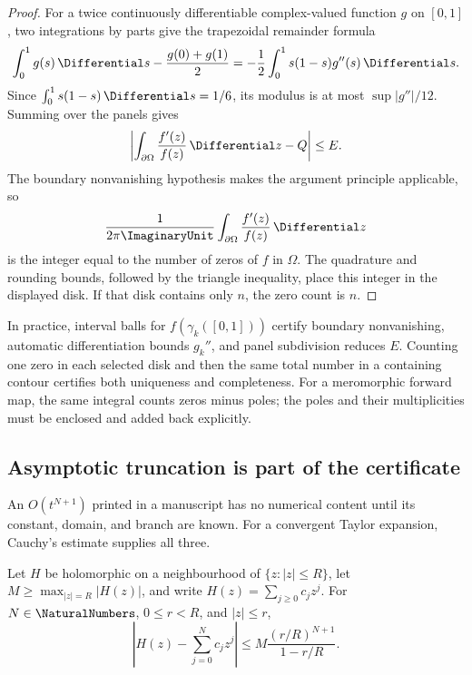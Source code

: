 \begin{proof}
For a twice continuously differentiable complex-valued function \(g\) on
\([0,1]\), two integrations by parts give the trapezoidal remainder formula
\[
 \int_0^1g(s)\,\Differential s-\frac{g(0)+g(1)}2
 =-\frac12\int_0^1s(1-s)g''(s)\,\Differential s.
\]
Since \(\int_0^1s(1-s)\,\Differential s=1/6\), its modulus is at most
\(\sup\lvert g''\rvert/12\).  Summing over the panels gives
\[
 \left\lvert\int_{\partial\Omega}\frac{f'(z)}{f(z)}\,\Differential z-Q\right\rvert
 \le E.
\]
The boundary nonvanishing hypothesis makes the argument principle applicable,
so
\[
 \frac1{2\pi\ImaginaryUnit}\int_{\partial\Omega}\frac{f'(z)}{f(z)}\,\Differential z
\]
is the integer equal to the number of zeros of \(f\) in \(\Omega\).  The
quadrature and rounding bounds, followed by the triangle inequality, place
this integer in the displayed disk.  If that disk contains only \(n\), the
zero count is \(n\).
\end{proof}

In practice, interval balls for \(f(\gamma_k([0,1]))\) certify boundary
nonvanishing, automatic differentiation bounds \(g_k''\), and panel
subdivision reduces \(E\).  Counting one zero in each selected disk and then
the same total number in a containing contour certifies both uniqueness and
completeness.  For a meromorphic forward map, the same integral counts zeros
minus poles; the poles and their multiplicities must be enclosed and added
back explicitly.

\subsection{Asymptotic truncation is part of the certificate}
\label{sec:asymptotic-truncation-discipline}

An \(O(t^{N+1})\) printed in a manuscript has no numerical content until its
constant, domain, and branch are known.  For a convergent Taylor expansion,
Cauchy's estimate supplies all three.

\begin{theorem}
\label{thm:cauchy-truncation-tail}
Let \(H\) be holomorphic on a neighbourhood of
\(\{z:\lvert z\rvert\le R\}\), let
\(M\ge\max_{\lvert z\rvert=R}\lvert H(z)\rvert\), and write
\(H(z)=\sum_{j\ge0}c_jz^j\).  For \(N\in\NaturalNumbers\), \(0\le r<R\), and
\(\lvert z\rvert\le r\),
\[
 \left\lvert H(z)-\sum_{j=0}^{N}c_jz^j\right\rvert
 \le M\frac{(r/R)^{N+1}}{1-r/R}.
\]
\end{theorem}

